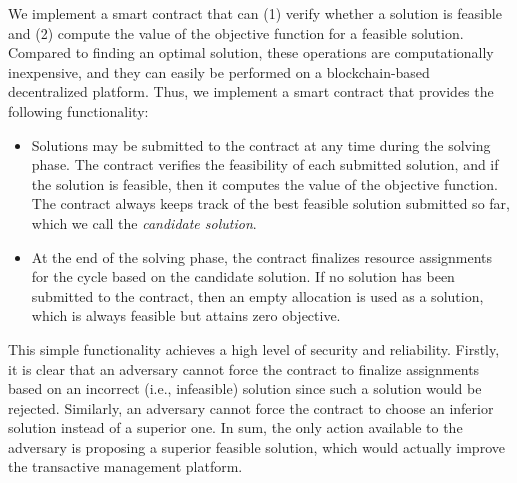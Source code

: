 \label{sec:smartcontract}

We implement a smart contract that can (1) verify whether a solution is feasible and (2) compute the value of the objective function for a feasible solution.
Compared to finding an optimal solution, these operations are computationally inexpensive, and they can easily be performed on a blockchain-based decentralized platform. Thus, we implement a smart contract that provides the following functionality:
\begin{itemize}
\item Solutions may be submitted to the contract at any time during the solving phase. 
The contract verifies the feasibility of each submitted solution, and if the solution is feasible, then it computes the value of the objective function.
The contract always keeps track of the best feasible solution submitted so far, which we call the \emph{candidate solution}.
\item At the end of the solving phase, the contract finalizes resource assignments for the cycle based on the candidate solution. If no solution has been submitted to the contract, then an empty allocation is used as a solution, which is always feasible but attains zero objective. %
\end{itemize}

This simple functionality achieves a high level of security and reliability.
Firstly, it is clear that an adversary cannot force the contract to finalize assignments based on an incorrect (i.e., infeasible) solution since such a solution would be rejected.
Similarly, an adversary cannot force the contract to choose an inferior solution instead of a superior one.
In sum, the only action available to the adversary is proposing a superior feasible solution, which would actually improve the transactive management platform.


